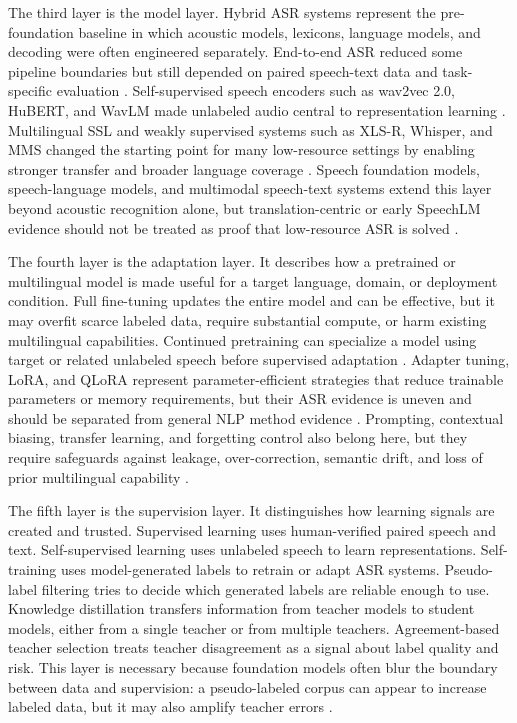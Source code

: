 \documentclass[pdflatex,sn-basic]{sn-jnl}
\theoremstyle{thmstyleone}
\theoremstyle{thmstyletwo}
\theoremstyle{thmstylethree}
\begin{document}
The third layer is the model layer. Hybrid ASR systems represent the pre-foundation baseline in which acoustic models, lexicons, language models, and decoding were often engineered separately. End-to-end ASR reduced some pipeline boundaries but still depended on paired speech-text data and task-specific evaluation \citep{prabhavalkar2023_e2e_asr_survey}. Self-supervised speech encoders such as wav2vec 2.0, HuBERT, and WavLM made unlabeled audio central to representation learning \citep{mohamed2022_ssl_review,baevski2020wav2vec2,hsu2021hubert,chen2022wavlm}. Multilingual SSL and weakly supervised systems such as XLS-R, Whisper, and MMS changed the starting point for many low-resource settings by enabling stronger transfer and broader language coverage \citep{babu22_interspeech,pmlr-v202-radford23a,pratap2024mms}. Speech foundation models, speech-language models, and multimodal speech-text systems extend this layer beyond acoustic recognition alone, but translation-centric or early SpeechLM evidence should not be treated as proof that low-resource ASR is solved \citep{seamless2025_joint_speech_text_mt,tian25b_interspeech}.

The fourth layer is the adaptation layer. It describes how a pretrained or multilingual model is made useful for a target language, domain, or deployment condition. Full fine-tuning updates the entire model and can be effective, but it may overfit scarce labeled data, require substantial compute, or harm existing multilingual capabilities. Continued pretraining can specialize a model using target or related unlabeled speech before supervised adaptation \citep{getman24_interspeech}. Adapter tuning, LoRA, and QLoRA represent parameter-efficient strategies that reduce trainable parameters or memory requirements, but their ASR evidence is uneven and should be separated from general NLP method evidence \citep{pmlr-v97-houlsby19a,hu2022lora,dettmers2023qlora}. Prompting, contextual biasing, transfer learning, and forgetting control also belong here, but they require safeguards against leakage, over-correction, semantic drift, and loss of prior multilingual capability \citep{udupa24_interspeech,qian24_interspeech}.

The fifth layer is the supervision layer. It distinguishes how learning signals are created and trusted. Supervised learning uses human-verified paired speech and text. Self-supervised learning uses unlabeled speech to learn representations. Self-training uses model-generated labels to retrain or adapt ASR systems. Pseudo-label filtering tries to decide which generated labels are reliable enough to use. Knowledge distillation transfers information from teacher models to student models, either from a single teacher or from multiple teachers. Agreement-based teacher selection treats teacher disagreement as a signal about label quality and risk. This layer is necessary because foundation models often blur the boundary between data and supervision: a pseudo-labeled corpus can appear to increase labeled data, but it may also amplify teacher errors \citep{kahn2019selftraining,park20d_interspeech,khurana2020dust,leal21_interspeech,farooq2023must,ferraz2023multilingualdistilwhisper,bhogale24_interspeech}.
\end{document}

